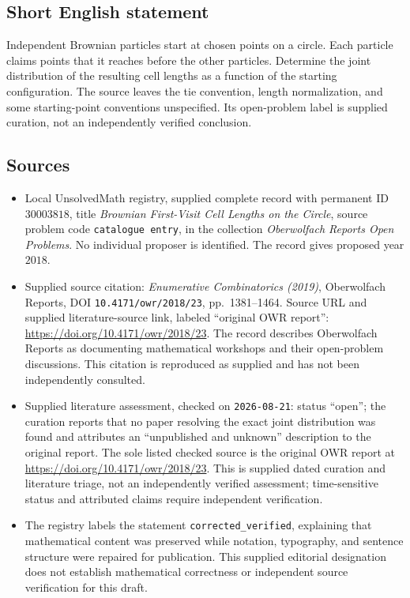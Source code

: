 \documentclass[11pt]{article}
\begin{document}
\subsection{Short English statement}
Independent Brownian particles start at chosen points on a circle. Each particle claims points that it reaches before the other particles. Determine the joint distribution of the resulting cell lengths as a function of the starting configuration. The source leaves the tie convention, length normalization, and some starting-point conventions unspecified. Its open-problem label is supplied curation, not an independently verified conclusion.
\subsection{Sources}
\begin{itemize}
\item Local UnsolvedMath registry, supplied complete record with permanent ID \(30003818\), title \emph{Brownian First-Visit Cell Lengths on the Circle}, source problem code \texttt{catalogue entry}, in the collection \emph{Oberwolfach Reports Open Problems}. No individual proposer is identified. The record gives proposed year \(2018\).
\item Supplied source citation: \emph{Enumerative Combinatorics (2019)}, Oberwolfach Reports, DOI \texttt{10.4171/owr/2018/23}, pp.\ 1381--1464. Source URL and supplied literature-source link, labeled ``original OWR report'': \url{https://doi.org/10.4171/owr/2018/23}. The record describes Oberwolfach Reports as documenting mathematical workshops and their open-problem discussions. This citation is reproduced as supplied and has not been independently consulted.
\item Supplied literature assessment, checked on \texttt{2026-08-21}: status ``open''; the curation reports that no paper resolving the exact joint distribution was found and attributes an ``unpublished and unknown'' description to the original report. The sole listed checked source is the original OWR report at \url{https://doi.org/10.4171/owr/2018/23}. This is supplied dated curation and literature triage, not an independently verified assessment; time-sensitive status and attributed claims require independent verification.
\item The registry labels the statement \texttt{corrected\_verified}, explaining that mathematical content was preserved while notation, typography, and sentence structure were repaired for publication. This supplied editorial designation does not establish mathematical correctness or independent source verification for this draft.
\end{itemize}
\end{document}
